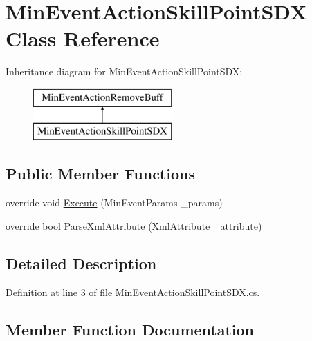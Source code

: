 \hypertarget{class_min_event_action_skill_point_s_d_x}{}\section{Min\+Event\+Action\+Skill\+Point\+S\+DX Class Reference}
\label{class_min_event_action_skill_point_s_d_x}
Inheritance diagram for Min\+Event\+Action\+Skill\+Point\+S\+DX\+:\begin{figure}[H]
\begin{center}
\leavevmode
\includegraphics[height=2.000000cm]{class_min_event_action_skill_point_s_d_x}
\end{center}
\end{figure}
\subsection*{Public Member Functions}
\begin{DoxyCompactItemize}
\item 
override void \mbox{\hyperlink{class_min_event_action_skill_point_s_d_x_a501b0827ae3847f1c88b03a5554cc8cb}{Execute}} (Min\+Event\+Params \+\_\+params)
\item 
override bool \mbox{\hyperlink{class_min_event_action_skill_point_s_d_x_a8122846c4ccf722aed8022dfa650bab2}{Parse\+Xml\+Attribute}} (Xml\+Attribute \+\_\+attribute)
\end{DoxyCompactItemize}


\subsection{Detailed Description}


Definition at line 3 of file Min\+Event\+Action\+Skill\+Point\+S\+D\+X.\+cs.



\subsection{Member Function Documentation}
\mbox{\label{class_min_event_action_skill_point_s_d_x_a501b0827ae3847f1c88b03a5554cc8cb}} 
